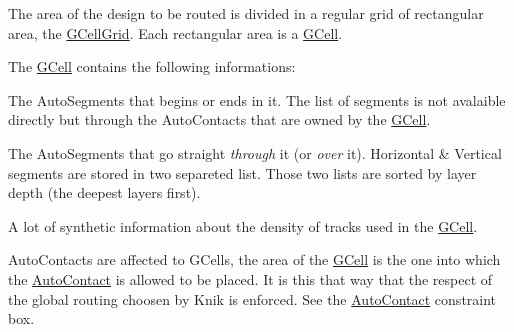 The area of the design to be routed is divided in a regular grid of rectangular area, the \mbox{\hyperlink{classKatabatic_1_1GCellGrid}{G\+Cell\+Grid}}. Each rectangular area is a \mbox{\hyperlink{classKatabatic_1_1GCell}{G\+Cell}}.

The \mbox{\hyperlink{classKatabatic_1_1GCell}{G\+Cell}} contains the following informations\+:
\begin{DoxyItemize}
\item The Auto\+Segments that begins or ends in it. The list of segments is not avalaible directly but through the Auto\+Contacts that are owned by the \mbox{\hyperlink{classKatabatic_1_1GCell}{G\+Cell}}.
\item The Auto\+Segments that go straight {\itshape through} it (or {\itshape over} it). Horizontal \& Vertical segments are stored in two separeted list. Those two lists are sorted by layer depth (the deepest layers first).
\item A lot of synthetic information about the density of tracks used in the \mbox{\hyperlink{classKatabatic_1_1GCell}{G\+Cell}}.
\end{DoxyItemize}

Auto\+Contacts are affected to G\+Cells, the area of the \mbox{\hyperlink{classKatabatic_1_1GCell}{G\+Cell}} is the one into which the \mbox{\hyperlink{classKatabatic_1_1AutoContact}{Auto\+Contact}} is allowed to be placed. It is this that way that the respect of the global routing choosen by Knik is enforced. See the \mbox{\hyperlink{classKatabatic_1_1AutoContact}{Auto\+Contact}} constraint box.


